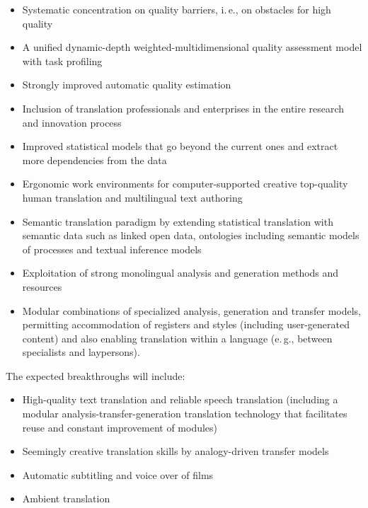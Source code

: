 \documentclass[10pt, plain]{../../metanetpaper}
\begin{document}
\begin{multicols}{2}
\begin{itemize}
\item Systematic concentration on quality barriers, i.\,e., on obstacles for high quality
\item A unified dynamic-depth weighted-multidimensional quality assessment model with task profiling
\item Strongly improved automatic quality estimation
\item Inclusion of translation professionals and enterprises in the entire research and innovation process
\item Improved statistical models that go beyond the current ones and extract more dependencies from the data
\item Ergonomic work environments for computer-supported creative top-quality human translation and multilingual text authoring
\item Semantic translation paradigm by extending statistical translation with semantic data such as linked open data, ontologies including semantic models of processes and textual inference models
\item Exploitation of strong monolingual analysis and generation methods and resources
\item Modular combinations of specialized analysis, generation and transfer models, permitting accommodation of registers and styles (including user-generated content) and also enabling translation within a language (e.\,g., between specialists and laypersons).
\end{itemize}

The expected breakthroughs will include:

\begin{itemize}
\item High-quality text translation and reliable speech translation (including a modular analysis-transfer-generation translation technology that facilitates reuse and constant improvement of modules)
\item Seemingly creative translation skills by analogy-driven transfer models
\item Automatic subtitling and voice over of films
\item Ambient translation
\end{itemize}


\end{multicols}
\end{document}

